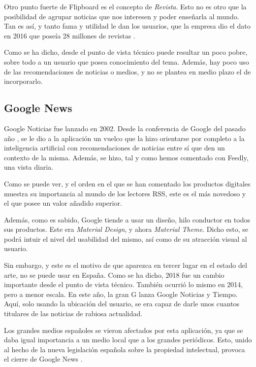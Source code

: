 Otro punto fuerte de Flipboard es el concepto de \textit{Revista}. Esto no es otro que la posibilidad de agrupar noticias que nos interesen y poder enseñarla al mundo. Tan es así, y tanto fama y utilidad le dan los usuarios, que la empresa dio el dato en 2016 que poseía 28 millones de revistas .


Como se ha dicho, desde el punto de vista técnico puede resultar un poco pobre, sobre todo a un usuario que posea conocimiento del tema. Además, hay poco uso de las recomendaciones de noticias o medios, y no se plantea en medio plazo el de incorporarlo.

\subsection{Google News}

Google Noticias fue lanzado en 2002. Desde la conferencia de Google del pasado año , se le dio a la aplicación un vuelco que la hizo orientarse por completo a la inteligencia artificial con recomendaciones de noticias entre sí que den un contexto de la misma. Además, se hizo, tal y como hemos comentado con Feedly, una vista diaria.


Como se puede ver, y el orden en el que se han comentado los productos digitales muestra su importancia al mundo de los lectores RSS, este es el más novedoso y el que posee un valor añadido superior.

Además, como es sabido, Google tiende a usar un diseño, hilo conductor en todos sus productos. Este era \textit{Material Design}, y ahora \textit{Material Theme}. Dicho esto, se podrá intuir el nivel del usabilidad del mismo, así como de su atracción visual al usuario.

Sin embargo, y este es el motivo de que aparezca en tercer lugar en el estado del arte, no se puede usar en España. Como se ha dicho, 2018 fue un cambio importante desde el punto de vista técnico. También ocurrió lo mismo en 2014, pero a menor escala. En este año, la gran G lanza Google Noticias y Tiempo. Aquí, solo usando la ubicación del usuario, se era capaz de darle unos cuantos titulares de las noticias de rabiosa actualidad.

Los grandes medios españoles se vieron afectados por esta aplicación, ya que se daba igual importancia a un medio local que a los grandes periódicos. Esto, unido al hecho de la nueva legislación española sobre la propiedad intelectual, provoca el cierre de Google News .

